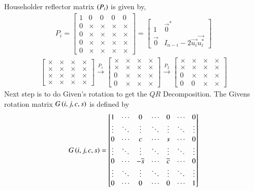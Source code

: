 \documentclass[journal]{IEEEtran}
\begin{document}
Householder reflector matrix $\left(P_{i}\right)$ is given by,
\begin{align}
	P_{i} = 
	\begin{bmatrix}
		1 & 0 & 0 & 0 & 0\\    
		0 & \times & \times & \times & \times\\
		0 & \times & \times & \times & \times\\
		0 & \times & \times & \times & \times\\
		0 & \times & \times & \times & \times
	\end{bmatrix} = \begin{bmatrix}
		1 & \vec{0}^{\ast}\\    
		\vec{0} & I_{n - i} - 2\vec{u_{i}}\vec{u_{i}^{\ast}}
	\end{bmatrix}
\end{align}
\begin{align}
	\begin{bmatrix}
		\times & \times & \times & \times \\
		\times & \times & \times & \times \\
		\times & \times & \times & \times \\
		\times & \times & \times & \times
	\end{bmatrix}
	\xrightarrow{P_1}
	\begin{bmatrix}
		\times & \times & \times & \times \\
		\times & \times & \times & \times \\
		0 & \times & \times & \times \\
		0 & \times & \times & \times
	\end{bmatrix}
	\xrightarrow{P_2}
	\begin{bmatrix}
		\times & \times & \times & \times \\
		\times & \times & \times & \times \\
		0 & \times & \times & \times \\
		0 & 0 & \times & \times
	\end{bmatrix}
\end{align}
Next step is to do Given's rotation to get the $QR$ Decomposition.
\newline
The Givens rotation matrix $G\left(i, j, c, s\right)$ is defined by
\begin{align}
	G\left(i, j, c, s\right) = 
	\begin{bmatrix}
		1 & \cdots & 0 & \cdots & 0 & \cdots & 0 \\
		\vdots & \ddots & \vdots & \ddots & \vdots & \ddots & \vdots \\
		0 & \cdots & c & \cdots & s & \cdots & 0 \\
		\vdots & \ddots & \vdots & \ddots & \vdots & \ddots & \vdots \\
		0 & \cdots & -\overline{s} & \cdots & \overline{c} & \cdots & 0 \\
		\vdots & \ddots & \vdots & \ddots & \vdots & \ddots & \vdots \\
		0 & \cdots & 0 & \cdots & 0 & \cdots & 1
	\end{bmatrix}
\end{align}
\end{document}

